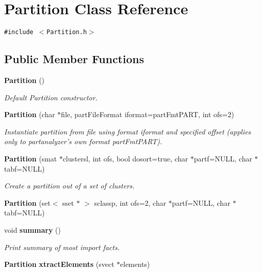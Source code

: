 \section{Partition Class Reference}
\label{classPartition}
{\tt \#include $<$Partition.h$>$}

\subsection*{Public Member Functions}
\begin{CompactItemize}
\item 
{\bf Partition} ()
\begin{CompactList}\small\item\em Default Partition constructor. \item\end{CompactList}\item 
{\bf Partition} (char $\ast$file, part\-File\-Format iformat=part\-Fmt\-PART, int ofs=2)\label{classPartition_a1}

\begin{CompactList}\small\item\em Instantiate partition from file using format iformat and specified offset (applies only to partanalyzer's own format part\-Fmt\-PART). \item\end{CompactList}\item 
{\bf Partition} (smat $\ast$clustersl, int ofs, bool dosort=true, char $\ast$partf=NULL, char $\ast$tabf=NULL)\label{classPartition_a2}

\begin{CompactList}\small\item\em Create a partition out of a set of clusters. \item\end{CompactList}\item 
{\bf Partition} (set$<$ sset $\ast$ $>$ sclassp, int ofs=2, char $\ast$partf=NULL, char $\ast$tabf=NULL)
\item 
void {\bf summary} ()\label{classPartition_a4}

\begin{CompactList}\small\item\em Print summary of most import facts. \item\end{CompactList}\item 
{\bf Partition} {\bf xtract\-Elements} (svect $\ast$elements)\label{classPartition_a5}


\end{CompactItemize}
